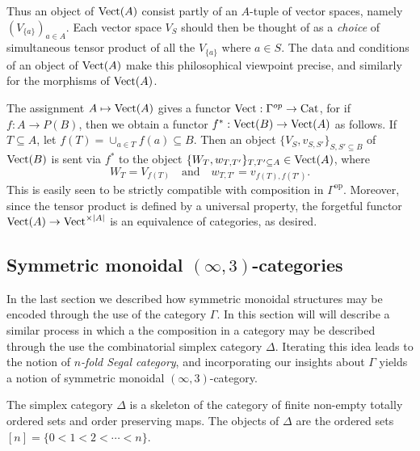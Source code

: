 \documentclass{amsart}
\begin{document}
Thus an object of $\mathrm{Vect}(A)$ consist partly of an $A$-tuple of vector spaces, namely $ (V_{\{a\}})_{a \in A}$. Each vector space $V_S$ should then be thought of as a {\em choice} of simultaneous tensor product of all the $V_{\{a\}}$ where $a \in S$. The data and conditions of an object of $\mathrm{Vect}(A)$ make this philosophical viewpoint precise, and similarly for the morphisms of $\mathrm{Vect}(A)$. 

The assignment $A \mapsto \mathrm{Vect}(A)$ gives a functor $\mathrm{Vect}: \Gamma^{op} \to \mathrm{Cat}$, for if $f: A \to P(B)$, then we obtain a functor $f^*: \mathrm{Vect}(B) \to \mathrm{Vect}(A)$ as follows. If $T \subseteq A$, let $f(T) = \cup_{a \in T} f(a) \subseteq B$. Then an object $\{ V_S, v_{S,S'} \}_{S, S' \subseteq B}$ of $\mathrm{Vect}(B)$ is sent via $f^*$ to the object $\{ W_T, w_{T, T'} \}_{T, T' \subseteq A} \in \mathrm{Vect}(A)$, where 
\begin{equation*}
	W_T = V_{f(T)} \quad \textrm{and} \quad  w_{T, T'} = v_{f(T), f(T')}.
\end{equation*}
This is easily seen to be strictly compatible with composition in $\Gamma^\text{op}$. Moreover, since the tensor product is defined by a universal property, the forgetful functor $\mathrm{Vect}(A) \to \mathrm{Vect}^{\times |A|}$ is an equivalence of categories, as desired.  


\subsection{Symmetric monoidal $(\infty,3)$-categories}


In the last section we described how symmetric monoidal structures may be encoded through the use of the category $\Gamma$. In this section will will describe a similar process in which a the composition in a category may be described through the use the combinatorial simplex category $\Delta$. Iterating this idea leads to the notion of {\em $n$-fold Segal category}, and incorporating our insights about $\Gamma$ yields a notion of symmetric monoidal $(\infty,3)$-category.  

\begin{definition}
	The simplex category $\Delta$ is a skeleton of the category of finite non-empty totally ordered sets and order preserving maps. The objects of $\Delta$ are the ordered sets $[n] = \{ 0 < 1 < 2 < \cdots < n\}$. 
\end{definition}
\end{document}
